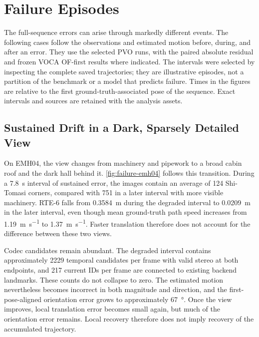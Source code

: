 
\section{Failure Episodes}\label{sec:failure-episodes}

The full-sequence errors can arise through markedly different events. The
following cases follow the observations and estimated motion before, during,
and after an error. They use the selected PVO runs, with the paired absolute
residual and frozen VOCA OF-first results where indicated. The intervals were
selected by inspecting the complete saved trajectories; they are illustrative
episodes, not a partition of the benchmark or a model that predicts failure.
Times in the figures are relative to the first ground-truth-associated pose of
the sequence. Exact intervals and sources are retained with the analysis assets.

\subsection{Sustained Drift in a Dark, Sparsely Detailed View}

On EMH04, the view changes from machinery and pipework to a broad cabin roof
and the dark hall behind it. \autoref{fig:failure-emh04} follows this transition.
During a \SI{7.8}{\second} interval of sustained error, the images contain an
average of 124 Shi-Tomasi corners, compared with 751 in a later interval with
more visible machinery. RTE-6 falls from \SI{0.3584}{\metre} during the
degraded interval to \SI{0.0209}{\metre} in the later interval, even though mean
ground-truth path speed increases from \SI{1.19}{\metre\per\second} to
\SI{1.37}{\metre\per\second}. Faster translation therefore does not account
for the difference between these two views.

Codec candidates remain abundant. The degraded interval contains approximately
2229 temporal candidates per frame with valid stereo at both endpoints, and
217 current IDs per frame are connected to existing backend landmarks. These
counts do not collapse to zero. The estimated motion nevertheless becomes
incorrect in both magnitude and direction, and the first-pose-aligned
orientation error grows to approximately \SI{67}{\degree}. Once the view
improves, local translation error becomes small again, but much of the
orientation error remains. Local recovery therefore does not imply recovery
of the accumulated trajectory.

